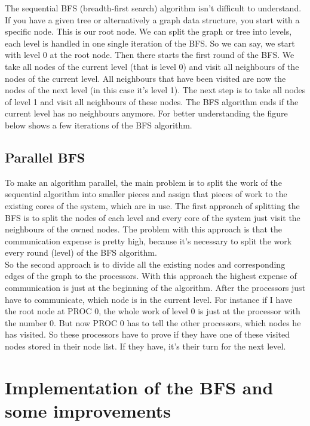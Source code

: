 \documentclass[11pt,a4paper]{article}
\begin{document}
The sequential BFS (breadth-first search) algorithm isn't difficult to understand. If you have a given tree or alternatively a graph data structure, you start with a specific node. This is our root node. We can split the graph or tree into levels, each level is handled in one single iteration of the BFS. So we can say, we start with level 0 at the root node.
Then there starts the first round of the BFS. We take all nodes of the current level (that is level 0) and visit all neighbours of the nodes of the current level. All neighbours that have been visited are now the nodes of the next level (in this case it's level 1). The next step is to take all nodes of level 1 and visit all neighbours of these nodes. The BFS algorithm ends if the current level has no neighbours anymore. For better understanding the figure below shows a few iterations of the BFS algorithm.

\subsection{Parallel BFS}
\label{sec:parallel-bfs}

To make an algorithm parallel, the main problem is to split the work of the sequential algorithm into smaller pieces and assign that pieces of work to the existing cores of the system, which are in use. 
The first approach of splitting the BFS is to split the nodes of each level and every core of the system just visit the neighbours of the owned nodes. The problem with this approach is that the communication expense is pretty high, because it's necessary to split the work every round (level) of the BFS algorithm.\\
So the second approach is to divide all the existing nodes and corresponding edges of the graph to the processors. With this approach the highest expense of communication is just at the beginning of the algorithm. After the processors just have to communicate, which node is in the current level. For instance if I have the root node at PROC 0, the whole work of level 0 is just at the processor with the number 0. But now PROC 0 has to tell the other processors, which nodes he has visited. So these processors have to prove if they have one of these visited nodes stored in their node list. If they have, it's their turn for the next level.

\section{Implementation of the BFS and some improvements}
\label{sec:implementations}
\end{document}
